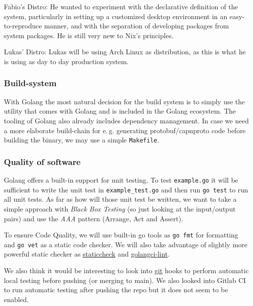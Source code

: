 \documentclass[a4paper,english,10pt,NET]{tumarticle}
\renewcommand{\eg}{\mbox{e.\,g.}\xspace} %
\begin{document}
Fabio's Distro:
He wanted to experiment with the declarative definition of the system, particularly in setting up a customized desktop environment in an easy-to-reproduce manner, and with the separation of developing packages from system packages. He is still very new to Nix's principles.

Lukas' Distro:
Lukas will be using Arch Linux as distribution, as this is what he is using as day to day production system.

\subsubsection{Build-system}
With Golang the most natural decision for the build system is to simply use the utility that comes with Golang and is included in the Golang ecosystem.
The tooling of Golang also already includes dependency management.
In case we need a more elaborate build-chain for \eg generating protobuf/capnproto code before building the binary, we may use a simple \texttt{Makefile}.

\subsubsection{Quality of software}

Golang offers a built-in support for unit testing. To test \verb|example.go| it will be sufficient to write the unit test in \verb|example_test.go| and then run \verb|go test| to run all unit tests. As far as how will those unit test be written, we want to take a simple approach with \textit{Black Box Testing} (so just looking at the input/output pairs) and use the \textit{AAA} pattern (Arrange, Act and Assert).

To ensure Code Quality, we will use built-in go tools as \verb|go fmt| for formatting and \verb|go vet| as a static code checker. We will also take advantage of slightly more powerful static checker as \href{https://staticcheck.dev/}{staticcheck} and \href{https://github.com/golangci/golangci-lint}{golangci-lint}.

We also think it would be interesting to look into \href{https://git-scm.com/book/en/v2/Customizing-Git-Git-Hooks}{git} hooks to perform automatic local testing before pushing (or merging to main). We also looked into Gitlab CI to run automatic testing after pushing the repo but it does not seem to be enabled.  

\end{document}
